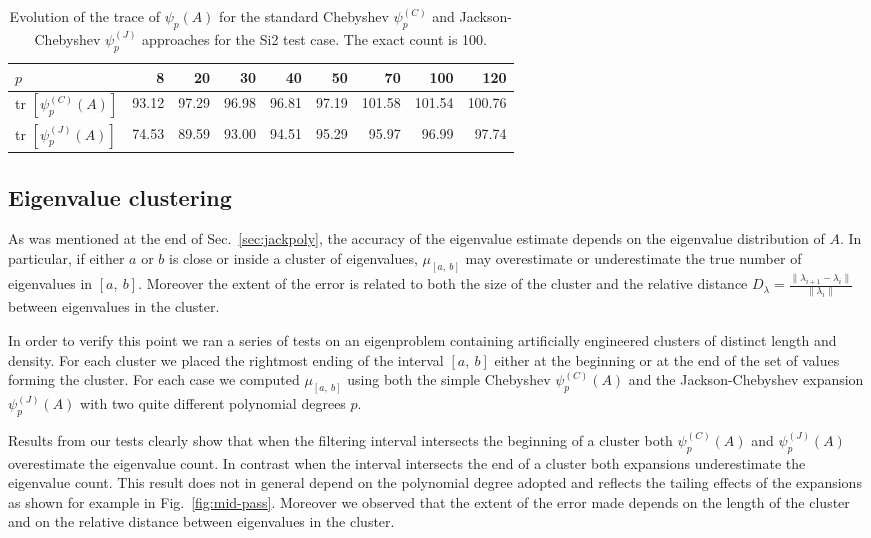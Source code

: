 \documentclass[12pt]{article}		\usepackage{tabls,multirow}
\newcommand{\ab}{[a, \ b]}
\begin{document}
\begin{table}[htb]
\begin{center}
\begin{tabular}{|l|r|r|r|r|r|r|r|r|} \hline 
  $p$  &  8 &  20 &  30 &  40 &  50 &  70 & 100 & 120 \\ \hline
 tr $ [ \psi_p^{(C)} (A) ] $ &
  93.12 &  97.29 &  96.98 &  96.81 &  97.19 & 101.58 & 101.54 & 100.76\\  \hline
tr  $ [ \psi_p^{(J)}(A)] $ & 74.53 & 89.59 & 93.00 &
 94.51 & 95.29 & 95.97 & 96.99 & 97.74 \\ \hline 
\end{tabular}
\end{center} 
\caption{Evolution of the trace of $\psi_p(A)$
  for the  standard Chebyshev $\psi_p^{(C)}$ and
  Jackson-Chebyshev $\psi_p^{(J)}$
  approaches for the Si2 test case. The exact count is 100.
  \label{tab:bias}}
\end{table}


\subsection{Eigenvalue clustering}
\label{sec:biasclst}
As was mentioned at the end of Sec.~\ref{sec:jackpoly}, the
accuracy of the eigenvalue estimate depends on the eigenvalue
distribution of $A$. In particular, if either $a$ or $b$ is close or
inside a cluster of eigenvalues, $\mu_{\ab}$ may overestimate or
underestimate the true number of eigenvalues in $\ab$. Moreover the
extent of the error is related to both the size of the cluster and the
relative distance $D_\lambda=\frac{\|\lambda_{i+1} -
  \lambda_i\|}{\|\lambda_i\|}$ between eigenvalues in the cluster.

In order to verify this point we ran a series of
tests on an eigenproblem containing artificially engineered
clusters of distinct length and density.  For each cluster we placed
the rightmost ending of the interval $\ab$ either at the beginning
or at the end of the set of values forming the cluster. For each case
we computed $\mu_{\ab}$ using both the simple Chebyshev
$\psi^{(C)}_p(A)$ and the Jackson-Chebyshev expansion $\psi_p^{(J)}(A)$ with
two quite different polynomial degrees $p$.

Results from our tests clearly show that when the filtering interval
intersects the beginning of a cluster both $\psi^{(C)}_p(A)$ and
$\psi_p^{(J)}(A)$ overestimate the eigenvalue count. In contrast when the
interval intersects the end of a cluster both expansions underestimate
the eigenvalue count. This result does not in general depend on the
polynomial degree adopted and reflects the tailing effects of the
expansions as shown for example in Fig.~\ref{fig:mid-pass}. Moreover
we observed that the extent of the error made depends on the length of
the cluster and on the relative distance between eigenvalues in the
cluster.
\end{document}
